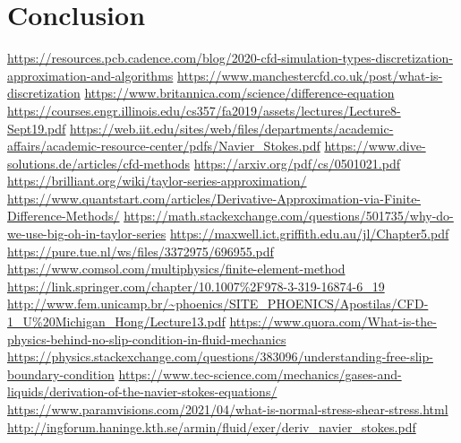 \documentclass{article}
\begin{document}
\section{Conclusion}


\newpage
\begin{thebibliography}{3}
\url{https://resources.pcb.cadence.com/blog/2020-cfd-simulation-types-discretization-approximation-and-algorithms}
\url{https://www.manchestercfd.co.uk/post/what-is-discretization}
\url{https://www.britannica.com/science/difference-equation}
\url{https://courses.engr.illinois.edu/cs357/fa2019/assets/lectures/Lecture8-Sept19.pdf}
\url{https://web.iit.edu/sites/web/files/departments/academic-affairs/academic-resource-center/pdfs/Navier_Stokes.pdf}
\url{https://www.dive-solutions.de/articles/cfd-methods}
\url{https://arxiv.org/pdf/cs/0501021.pdf}
\url{https://brilliant.org/wiki/taylor-series-approximation/}
\url{https://www.quantstart.com/articles/Derivative-Approximation-via-Finite-Difference-Methods/}
\url{https://math.stackexchange.com/questions/501735/why-do-we-use-big-oh-in-taylor-series}
\url{https://maxwell.ict.griffith.edu.au/jl/Chapter5.pdf}
\url{https://pure.tue.nl/ws/files/3372975/696955.pdf}
\url{https://www.comsol.com/multiphysics/finite-element-method}
\url{https://link.springer.com/chapter/10.1007\%2F978-3-319-16874-6\_19}
\url{http://www.fem.unicamp.br/~phoenics/SITE_PHOENICS/Apostilas/CFD-1_U\%20Michigan_Hong/Lecture13.pdf}
\url{https://www.quora.com/What-is-the-physics-behind-no-slip-condition-in-fluid-mechanics}
\url{https://physics.stackexchange.com/questions/383096/understanding-free-slip-boundary-condition}
\url{https://www.tec-science.com/mechanics/gases-and-liquids/derivation-of-the-navier-stokes-equations/}
\url{https://www.paramvisions.com/2021/04/what-is-normal-stress-shear-stress.html}
\url{http://ingforum.haninge.kth.se/armin/fluid/exer/deriv_navier_stokes.pdf}

\end{thebibliography}
\end{document}
